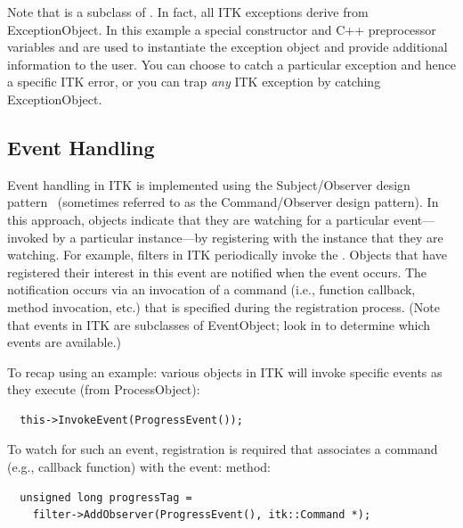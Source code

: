 Note that  is a subclass of
. In fact, all ITK exceptions derive
from ExceptionObject. In this example a special constructor and C++
preprocessor variables  and  are used to instantiate
the exception object and provide additional information to the user. You can
choose to catch a particular exception and hence a specific ITK error, or you
can trap \emph{any} ITK exception by catching ExceptionObject.


\subsection{Event Handling}%
\label{sec:EventHandling}%
%
%
%
%

Event handling in ITK is implemented using the Subject/Observer design
pattern~\cite{Gamma1995} (sometimes referred to as the Command/Observer
design pattern). In this approach, objects indicate that they are watching
for a particular event---invoked by a particular instance---by registering
with the instance that they are watching. For example, filters in ITK
periodically invoke the . Objects that have registered
their interest in this event are notified when the event occurs. The
notification occurs via an invocation of a command (i.e., function callback,
method invocation, etc.) that is specified during the registration
process. (Note that events in ITK are subclasses of EventObject; look
in  to determine which events are available.)

To recap using an example: various objects in ITK will invoke specific events
as they execute (from ProcessObject):
\small
\begin{verbatim}
  this->InvokeEvent(ProgressEvent());
\end{verbatim}
\normalsize

To watch for such an event, registration is required that associates a
command (e.g., callback function) with the event:
 method:
\small
\begin{verbatim}
  unsigned long progressTag =
    filter->AddObserver(ProgressEvent(), itk::Command *);
\end{verbatim}
\normalsize

